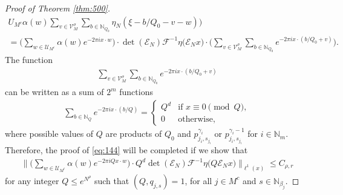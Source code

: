 \documentclass[a4paper,oneside]{amsart}
\theoremstyle{plain}
\theoremstyle{definition}
\numberwithin{equation}{section}
\newcounter{thm}
\theoremstyle{plain}
\newcommand{\NN}{\mathbb{N}}
\newcommand{\8}{\infty}
\begin{document}
\begin{proof}[Proof of Theorem \ref{thm:500}]
\begin{multline}
{    U_{M^c}}\alpha(w)\sum_{v\in\mathcal V_{M}^{\sigma}}\sum_{b\in\NN_{Q_0}}\eta_N(\xi-b/Q_0-v-w)\Big)\\
  =\Big(\sum_{w\in\mathcal U_{M^c}}\alpha(w)e^{-2\pi i x\cdot
    w}\Big)\cdot \det(\mathcal E_N)\mathcal
  F^{-1}\eta\big(\mathcal E_Nx\big)\cdot\Big(\sum_{v\in\mathcal
    V_{M}^{\sigma}}\sum_{b\in\NN_{Q_0}}e^{-2\pi i
    x\cdot (b/Q_0+v)}\Big).
\end{multline}
The function 
\begin{align}
  \label{eq:146}
  \sum_{v\in\mathcal
    V_{M}^{\sigma}}\sum_{b\in\NN_{Q_0}}e^{-2\pi i
    x\cdot (b/Q_0+v)}
\end{align}
 can be written as a sum of $2^m$ functions 
\begin{align}
  \label{eq:147}
  \sum_{b\in\NN_{Q}}e^{-2\pi i
    x\cdot (b/Q)} =
\begin{cases} 
Q^d & \mbox{if } x \equiv 0 \pmod{Q}, \\
0   & \mbox{otherwise,} 
\end{cases}  
\end{align}
where possible values of $Q$ are products of $Q_0$ and $p_{j_i,
  s_{j_i}}^{\gamma_i}$ or $p_{j_i, s_{j_i}}^{\gamma_i-1}$ for
$i\in\NN_m$. Therefore, the proof of \eqref{eq:144} will be completed
if we show  that
\begin{align}
  \label{eq:148}
  \Big\|\Big(\sum_{w\in\mathcal U_{M^c}}\alpha(w)e^{-2\pi i Qx\cdot
    w}\Big)\cdot Q^d\det(\mathcal E_N)\mathcal
  F^{-1}\eta\big(Q\mathcal E_N x\big)\Big\|_{\ell^1(x)}\le C_{\rho, r}
\end{align}
 for any integer $Q\le e^{N^{\rho}}$ such that
$(Q, q_{j, s})=1$, for all $j\in M^c$ and $s\in\NN_{\beta_j}$. 


\end{proof}
\end{document}
